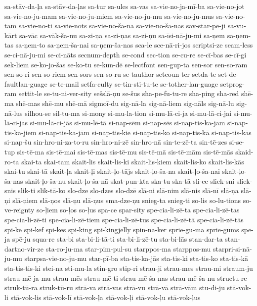{sa-stāv-da-ļa
sa-stāv-da-ļas
sa-tur
sa-ules
sa-vas
sa-vie-no-ja-mī-ba
sa-vie-no-jot
sa-vie-no-ju-mam
sa-vie-no-ju-miem
sa-vie-no-ju-mu
sa-vie-no-ju-mus
sa-vie-no-tam
sa-vie-no-ti
sa-vie-nots
sa-vie-no-ša-na
sa-vie-no-ša-nas
sav-star-pē-ji
sa-vu-kārt
sa-vāc
sa-vāk-ša-nu
sa-zi-ņa
sa-zi-ņas
sa-zi-ņu
sa-īsi-nā-ju-mi
sa-ņem
sa-ņem-tas
sa-ņem-to
sa-ņem-ša-nai
sa-ņem-ša-nas
sca-le
sce-nā-ri-jos
scriptsi-ze
seam-less
se-ci-nā-ju-mi
se-ci-nāts
secnum-depth
se-cond
sec-tion
se-cu-re
se-cī-bas
se-cī-gi
sek-liem
se-ko-jo-šas
se-ko-tu
se-kun-dē
se-lectfont
sen-gup-ta
sen-sor
sen-so-ram
sen-so-ri
sen-so-riem
sen-sors
sen-so-ru
se-tauthor
setcoun-ter
setda-te
set-de-faultlan-guage
se-te-mail
setfa-culty
se-tin-sti-tu-te
se-tother-lan-guage
setprog-ram
settit-le
se-tu-ni-ver-sity
sešslā-ņu
se-šus
sha-pe-fu-tu-re
sha-ping
sha-red
shē-ma
shē-mas
shē-mu
shē-mā
sigmoī-du
sig-nā-la
sig-nā-liem
sig-nāls
sig-nā-lu
sig-nā-lus
silhou-se
sil-tu-ma
si-mony
si-mu-la-tion
si-mu-lā-ci-ja
si-mu-lā-ci-jai
si-mu-lā-ci-jas
si-mu-lā-ci-jās
si-mu-lē-tā
si-nap-sēm
si-nap-sēs
si-nap-tis-ka-jam
si-nap-tis-ka-jiem
si-nap-tis-ka-jām
si-nap-tis-kie
si-nap-tis-ko
si-nap-tis-kā
si-nap-tis-kās
si-nap-šu
sin-hro-ni-za-to-ru
sin-hro-ni-zē
sin-hro-nā
sin-te-zē-ta
sin-tē-zes
si-se-tup
sis-tē-ma
sis-tē-mai
sis-tē-mas
sis-tē-mu
sis-tē-mā
sis-tē-mām
sis-tē-mās
skaid-ro-ta
skai-ta
skai-tam
skait-lis
skait-lis-ki
skait-lis-kiem
skait-lis-ko
skait-lis-kās
skai-tu
skai-tā
skait-ļa
skait-ļi
skait-ļo-tājs
skait-ļo-ša-na
skait-ļo-ša-nai
skait-ļo-ša-nas
skait-ļo-ša-nu
skait-ļo-ša-nā
skat-pun-kta
ska-tu
ska-tā
sli-ce
sliek-sni
sliek-snis
slik-ti
slik-tā-ko
slo-dze
slo-dzes
slo-dzē
slā-ni
slā-nim
slā-nis
slā-nī
slā-ņa
slā-ņi
slā-ņiem
slā-ņos
slā-ņu
slā-ņus
sma-dze-ņu
snieg-ta
snieg-ti
so-lis
so-lu-tions
so-ve-reignty
so-ļiem
so-ļos
so-ļus
spa-ce
spar-sity
spe-cia-li-zē-ta
spe-cia-li-zē-tas
spe-cia-li-zē-ti
spe-cia-li-zē-tiem
spe-cia-li-zē-tus
spe-cia-li-zē-tā
spe-cia-li-zē-tās
spi-ke
spi-kef
spi-kes
spi-king
spi-kingjelly
spin-na-ker
sprie-gu-ma
sprie-gums
spē-ja
spē-ju
squa-re
sta-bi
sta-bi-li-tā-ti
sta-bi-li-zē-tu
sta-bi-lās
stan-dar-ta
stan-dartno-vir-ze
sta-ro-ju-ma
star-pim-pul-su
starppos-ma
starppos-mu
starpri-si-nā-ju-mu
starpsa-vie-no-ju-mu
star-pī-ba
sta-tis-ka-jās
sta-tis-ki
sta-tis-ko
sta-tis-kā
sta-tis-tis-ki
stei-na
sti-mu-la
stin-gro
stip-ri
strau-ji
strau-mes
strau-mi
straum-ju
strau-mē-ja-mu
strau-mēs
strau-mē-ti
strau-mē-ša-nas
strau-mē-ša-nu
structu-re
struk-tū-ra
struk-tū-ru
strā-va
strā-vas
strā-vu
strā-vā
strā-vām
stu-di-ju
stā-vok-li
stā-vok-lis
stā-vok-lī
stā-vok-ļa
stā-vok-ļi
stā-vok-ļu
stā-vok-ļus
}
